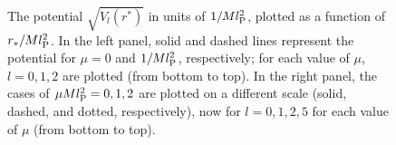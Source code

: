 \documentclass[12pt]{article}
\begin{document}
\begin{figure}[t]
\begin{center}
\centering
\end{center}
\caption{The potential $\sqrt{V_l(r^*)}$ in units of $1/Ml_{\rm P}^2$, 
 plotted as a function of $r_*/Ml_{\rm P}^2$.  In the left panel, 
 solid and dashed lines represent the potential for $\mu = 0$ and 
 $1/Ml_{\rm P}^2$, respectively; for each value of $\mu$, $l = 0,1,2$ 
 are plotted (from bottom to top).  In the right panel, the cases 
 of $\mu Ml_{\rm P}^2 = 0, 1, 2$ are plotted on a different scale 
 (solid, dashed, and dotted, respectively), now for $l = 0,1,2,5$ 
 for each value of $\mu$ (from bottom to top).}
\label{fig:potential}
\end{figure}
%
\end{document}
